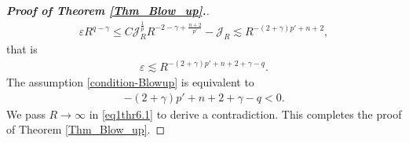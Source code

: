 \documentclass[10pt,a4paper]{amsart}
\begin{document}
\begin{proof}[\textbf{Proof of Theorem \ref{Thm_Blow_up}.}]
\begin{align*}
\varepsilon R^{q-\gamma} \leq C\mathcal{J}_R^{\frac{1}{p}}R^{-2-\gamma+\frac{n+2}{p'}} -\mathcal{J}_R \lesssim R^{-(2+\gamma)p'+n+2},
\end{align*}
that is 
\begin{align}
\varepsilon \lesssim R^{-(2+\gamma)p'+n+2+\gamma-q}. \label{eq1thr6.1}
\end{align}
The assumption \eqref{condition-Blowup} is equivalent to
\begin{align*}
-(2+\gamma)p'+n+2+\gamma-q < 0.
\end{align*}
We pass $R \to \infty$ in \eqref{eq1thr6.1} to derive a contradiction. This completes the proof of Theorem \ref{Thm_Blow_up}.
\end{proof}
\end{document}
